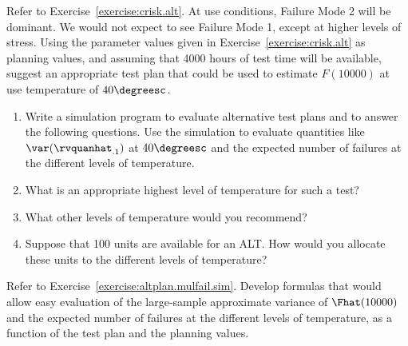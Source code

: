 \begin{exercise2}
\label{exercise:altplan.mulfail.sim}
Refer to Exercise~\ref{exercise:crisk.alt}.  At use conditions,
Failure Mode 2 will be dominant. We would not expect to see Failure
Mode 1, except at higher levels of stress.  Using the parameter values
given in Exercise~\ref{exercise:crisk.alt} as planning values, and
assuming that 4000 hours of test time will
be available, suggest
an appropriate test plan that could be used to
estimate $F(10000)$ at use temperature
of $40\degreesc$.
\begin{enumerate} 
\item
Write a simulation program to evaluate alternative test
plans and to answer the following questions.  Use the simulation to
evaluate quantities like $\var(\rvquanhat_{.1})$ at $40\degreesc$
and the expected number of failures at the different levels of
temperature.
\item
What is an appropriate highest level of temperature for such a
test?
\item
What other levels of temperature would you recommend?
\item
Suppose that 100 units are available for an ALT.  How would you
allocate these units to the different levels of temperature?
\end{enumerate}
\end{exercise2}

\begin{exercise1}
Refer to Exercise~\ref{exercise:altplan.mulfail.sim}.  Develop
formulas that would allow easy evaluation of the large-sample
approximate variance
of $\Fhat(10000)$ and the expected number of failures at the
different levels of temperature, as a function of the test plan and
the planning values.
\end{exercise1}

